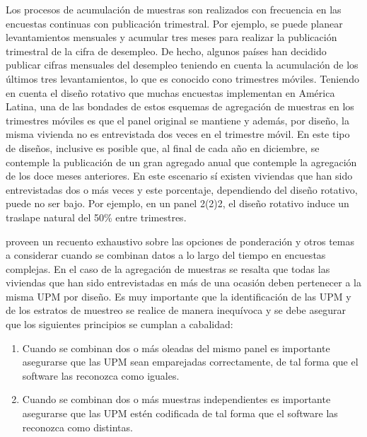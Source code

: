 \documentclass[
  12pt,
  spanish,
]{book}
\providecommand{\tightlist}{%
  \setlength{\itemsep}{0pt}\setlength{\parskip}{0pt}}
\begin{document}
Los procesos de acumulación de muestras son realizados con frecuencia en
las encuestas continuas con publicación trimestral. Por ejemplo, se
puede planear levantamientos mensuales y acumular tres meses para
realizar la publicación trimestral de la cifra de desempleo. De hecho,
algunos países han decidido publicar cifras mensuales del desempleo
teniendo en cuenta la acumulación de los últimos tres levantamientos, lo
que es conocido cono trimestres móviles. Teniendo en cuenta el diseño
rotativo que muchas encuestas implementan en América Latina, una de las
bondades de estos esquemas de agregación de muestras en los trimestres
móviles es que el panel original se mantiene y además, por diseño, la
misma vivienda no es entrevistada dos veces en el trimestre móvil. En
este tipo de diseños, inclusive es posible que, al final de cada año en
diciembre, se contemple la publicación de un gran agregado anual que
contemple la agregación de los doce meses anteriores. En este escenario
sí existen viviendas que han sido entrevistadas dos o más veces y este
porcentaje, dependiendo del diseño rotativo, puede no ser bajo. Por
ejemplo, en un panel 2(2)2, el diseño rotativo induce un traslape
natural del 50\% entre trimestres.

\citet[capítulos 7 y 8]{Korn_Graubard_1999} proveen un recuento exhaustivo
sobre las opciones de ponderación y otros temas a considerar cuando se
combinan datos a lo largo del tiempo en encuestas complejas. En el caso
de la agregación de muestras se resalta que todas las viviendas que han
sido entrevistadas en más de una ocasión deben pertenecer a la misma UPM
por diseño. Es muy importante que la identificación de las UPM y de los
estratos de muestreo se realice de manera inequívoca y se debe
asegurar que los siguientes principios se cumplan a cabalidad:

\begin{enumerate}
\def\labelenumi{\arabic{enumi}.}
\tightlist
\item
  Cuando se combinan dos o más oleadas del mismo panel es importante
  asegurarse que las UPM sean emparejadas correctamente, de tal forma
  que el software las reconozca como iguales.
\item
  Cuando se combinan dos o más muestras independientes es importante
  asegurarse que las UPM estén codificada de tal forma que el software
  las reconozca como distintas.
\end{enumerate}
\end{document}
